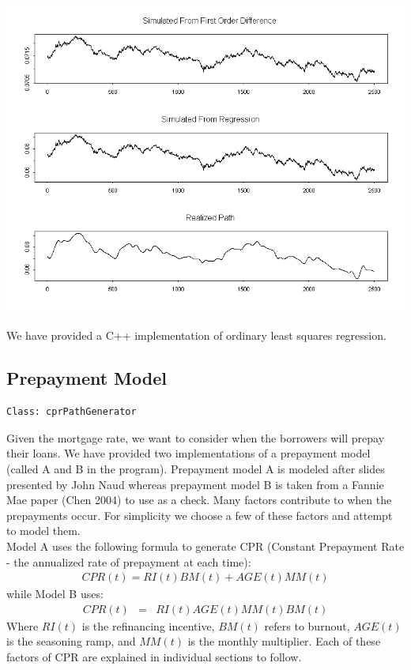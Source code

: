 \documentclass[10pt,letterpaper]{article}
\begin{document}
\begin{center}
\includegraphics[scale=0.45]{regressionprediction.png}\\
\end{center}
We have provided a C++ implementation of ordinary least squares regression.
\subsection{Prepayment Model}
\begin{verbatim}
Class: cprPathGenerator
\end{verbatim}
Given the mortgage rate, we want to consider when the borrowers will prepay their loans. We have provided two implementations of a prepayment model (called A and B in the program). Prepayment model A is modeled after slides presented by John Naud whereas prepayment model B is taken from a Fannie Mae paper (Chen 2004) to use as a check. Many factors contribute to when the prepayments occur. For simplicity we choose a few of these factors and attempt to model them. \\
Model A uses the following formula to generate CPR (Constant Prepayment Rate - the annualized rate of prepayment at each time):
\begin{eqnarray}
CPR(t) = RI(t)BM(t) + AGE(t)MM(t)
\end{eqnarray}
while Model B uses:
\begin{eqnarray}
CPR(t) & = & RI(t) AGE(t) MM(t) BM(t)
\end{eqnarray}
Where $RI(t)$ is the refinancing incentive, $BM(t)$ refers to burnout, $AGE(t)$ is the seasoning ramp, and $MM(t)$ is the monthly multiplier. Each of these factors of CPR are explained in individual sections to follow.
\end{document}
